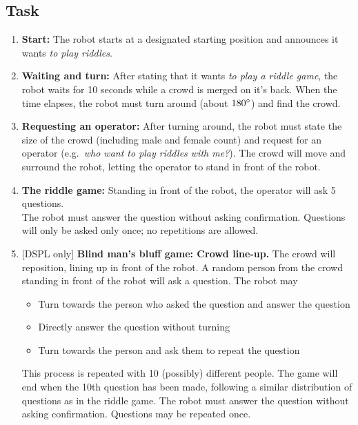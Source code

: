 \subsection{Task}
\begin{enumerate}
    \item \textbf{Start:} The robot starts at a designated starting position and announces it wants \textit{to play riddles}.

    \item \textbf{Waiting and turn:} After stating that it wants \textit{to play a riddle game}, the robot waits for 10 seconds while a crowd is merged on it's back. When the time elapses, the robot must turn around (about $180\degree$) and find the crowd.

    \item \textbf{Requesting an operator:} After turning around, the robot must state the size of the crowd (including male and female count\footnotemark) and request for an operator (e.g.~\textit{who want to play riddles with me?}). The crowd will move and surround the robot, letting the operator to stand in front of the robot.

    \item \textbf{The riddle game:} Standing in front of the robot, the operator will ask 5 questions.\\
    The robot must answer the question without asking confirmation. Questions will only be asked only once; no repetitions are allowed. 

    \setcounter{enumTempSPR}{\theenumi}
    \item {[DSPL only]} \textbf{Blind man's bluff game: Crowd line-up.} The crowd will reposition, lining up in front of the robot. A random person from the crowd standing in front of the robot will ask a question. The robot may
    \begin{itemize}
        \item Turn towards the person who asked the question and answer the question
        \item Directly answer the question without turning
        \item Turn towards the person and ask them to repeat the question
    \end{itemize}
    This process is repeated with 10 (possibly) different people. 
    The game will end when the 10th question has been made, following a similar distribution of questions as in the riddle game. The robot must answer the question without asking confirmation. Questions may be repeated once.


\end{enumerate}
